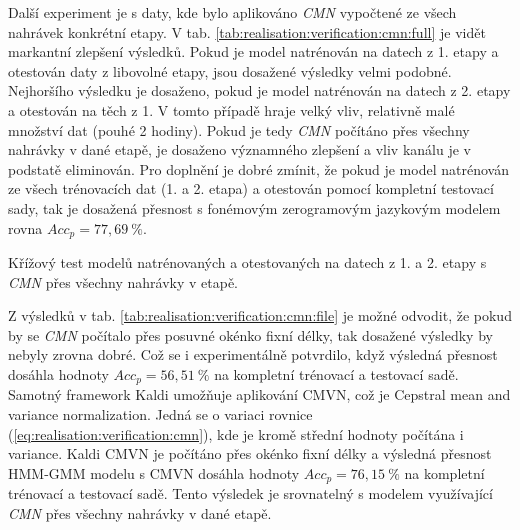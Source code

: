 Další experiment je s daty, kde bylo aplikováno \textit{CMN} vypočtené ze všech nahrávek konkrétní etapy. V tab. \ref{tab:realisation:verification:cmn:full} je vidět markantní zlepšení výsledků. Pokud je model natrénován na datech z 1. etapy a otestován daty z libovolné etapy, jsou dosažené výsledky velmi podobné. Nejhoršího výsledku je dosaženo, pokud je model natrénován na datech z 2. etapy a otestován na těch z 1. V tomto případě hraje velký vliv, relativně malé množství dat (pouhé 2 hodiny). Pokud je tedy \textit{CMN} počítáno přes všechny nahrávky v dané etapě, je dosaženo významného zlepšení a vliv kanálu je v podstatě eliminován. Pro doplnění je dobré zmínit, že pokud je model natrénován ze všech trénovacích dat (1. a 2. etapa) a otestován pomocí kompletní testovací sady, tak je dosažená přesnost s fonémovým zerogramovým jazykovým modelem rovna $Acc_{p} = 77,69\ \%$.


\begin{table}[htpb]
  \centering
  \def\arraystretch{1.5}
  \caption{Křížový test modelů natrénovaných a otestovaných na datech z 1. a 2. etapy s \textit{CMN}  přes všechny nahrávky v etapě.}
  \label{tab:realisation:verification:cmn:full}
\end{table}

Z výsledků v tab. \ref{tab:realisation:verification:cmn:file} je možné odvodit, že pokud by se \textit{CMN} počítalo přes posuvné okénko fixní délky, tak dosažené výsledky by nebyly zrovna dobré. Což se i experimentálně potvrdilo, když výsledná přesnost dosáhla hodnoty $Acc_{p} = 56,51\ \%$ na kompletní trénovací a testovací sadě. Samotný framework Kaldi umožňuje aplikování CMVN, což je Cepstral mean and variance normalization. Jedná se o variaci rovnice (\ref{eq:realisation:verification:cmn}), kde je kromě střední hodnoty počítána i variance. Kaldi CMVN je počítáno přes okénko fixní délky a výsledná přesnost HMM-GMM modelu s CMVN dosáhla hodnoty $Acc_{p} = 76,15\ \%$ na kompletní trénovací a testovací sadě. Tento výsledek je srovnatelný s modelem využívající \textit{CMN} přes všechny nahrávky v dané etapě.

